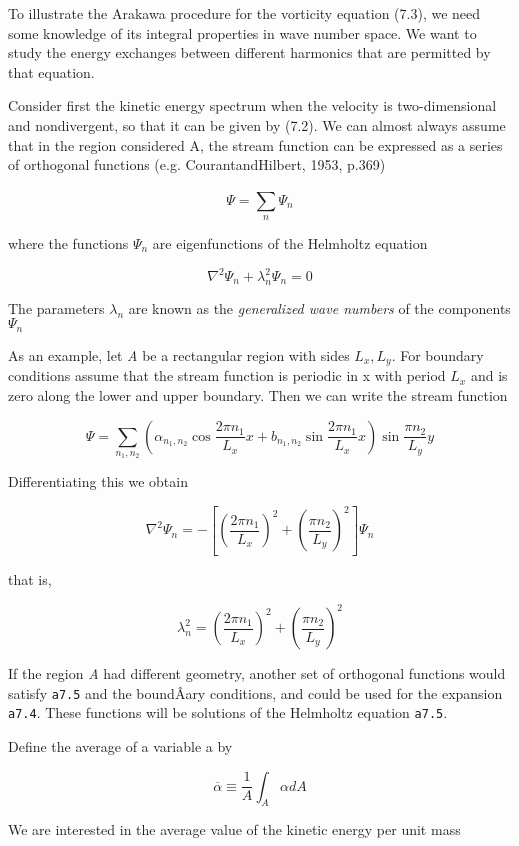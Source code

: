 To illustrate the Arakawa procedure for the vorticity equation (7.3), we
need some knowledge of its integral properties in wave number space. We
want to study the energy exchanges between different harmonics that are
permitted by that equation.

Consider first the kinetic energy spectrum when the velocity is
two-dimensional and nondivergent, so that it can be given by (7.2). We
can almost always assume that in the region considered A, the stream
function can be expressed as a series of orthogonal functions (e.g.
CourantandHilbert, 1953, p.369)

{\[\Psi = \sum_{n}^{}\Psi_{n}\]}

where the functions \(\Psi_n\) are eigenfunctions of the Helmholtz
equation

{\[\nabla^{2}\Psi_{n} + \lambda_{n}^{2}\Psi_{n} = 0\]}

The parameters \(\lambda_{n} \) are known as the \emph{generalized wave
numbers} of the components \(\Psi_{n}\)

As an example, let \emph{A} be a rectangular region with sides
\(L_x, L_y\). For boundary conditions assume that the stream function is
periodic in x with period \(L_{x}\) and is zero along the lower and
upper boundary. Then we can write the stream function

{\[\Psi = \sum_{n_1, n_2} \left( \alpha_{n_1, n_2}\cos{\frac{2\pi n_1}{L_x}x}+
 b_{n_1, n_2}\sin{\frac{2\pi n_1}{L_x}x} \right)\sin{ \frac{\pi n_2}{L_y} y}\]}

Differentiating this we obtain

\[\nabla^2\Psi_n = - \left\lbrack \left( \frac{2\pi n_1}{L_x} \right)^{2} +
\left( \frac{\pi n_2}{L_y}  \right)^{2} \right\rbrack\Psi_{n}\]

that is,

\[\lambda_n^2 = \left( \frac{2\pi n_1}{L_x} \right)^{2} + \left( \frac{\pi n_2}{L_y} \right)^{2}\]

If the region \emph{A} had different geometry, another set of orthogonal
functions would satisfy \texttt{a7.5} and the boundÂ­ary conditions, and
could be used for the expansion \texttt{a7.4}. These functions will be
solutions of the Helmholtz equation \texttt{a7.5}.

Define the average of a variable a by

\[\overline{\alpha} \equiv \frac{1}{A}\int_A \alpha d A\]

We are interested in the average value of the kinetic energy per unit
mass

